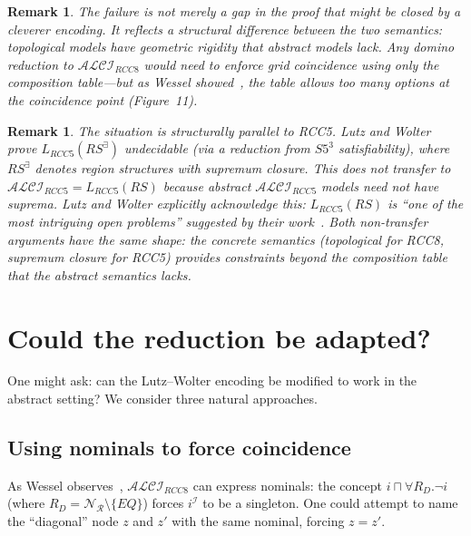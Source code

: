 \documentclass[11pt]{article}
\newtheorem{remark}[theorem]{Remark}
\newcommand{\ALCIRCC}[1]{\ensuremath{\mathcal{ALCI}_{\mathit{RCC#1}}}}
\newcommand{\LRCC}[1]{\ensuremath{L_{\mathit{RCC#1}}}}
\newcommand{\NR}{\ensuremath{\mathcal{N}_\mathcal{R}}}
\newcommand{\RS}{\mathit{RS}}
\newcommand{\RSE}{\mathit{RS}^{\exists}}
\begin{document}
\begin{remark}
  The failure is not merely a gap in the proof that might be closed by a
  cleverer encoding.  It reflects a \emph{structural} difference between the
  two semantics: topological models have geometric rigidity that abstract
  models lack.  Any domino reduction to $\ALCIRCC{8}$ would need to enforce
  grid coincidence using only the composition table---but as Wessel
  showed~\cite{Wessel2003}, the table allows too many options at the
  coincidence point (Figure~11).
\end{remark}

\begin{remark}\label{rem:rcc5-parallel}
  The situation is structurally parallel to RCC5.  Lutz and
  Wolter~\cite{LutzWolter2006} prove $\LRCC{5}(\RSE)$ undecidable (via a
  reduction from $S5^3$ satisfiability), where $\RSE$ denotes region
  structures with supremum closure.  This does not transfer to
  $\ALCIRCC{5} = \LRCC{5}(\RS)$ because abstract $\ALCIRCC{5}$ models need
  not have suprema.  Lutz and Wolter explicitly acknowledge this:
  $\LRCC{5}(\RS)$ is ``one of the most intriguing open problems'' suggested
  by their work~\cite{LutzWolter2006}.  Both non-transfer arguments have
  the same shape: the concrete semantics (topological for RCC8, supremum
  closure for RCC5) provides constraints beyond the composition table that
  the abstract semantics lacks.
\end{remark}

\section{Could the reduction be adapted?}
\label{sec:adapt}

One might ask: can the Lutz--Wolter encoding be modified to work in the
abstract setting?  We consider three natural approaches.

\subsection{Using nominals to force coincidence}

As Wessel observes~\cite{Wessel2003}, $\ALCIRCC{8}$ can express nominals:
the concept $\boxed{i} \sqcap \forall R_D.\neg\boxed{i}$ (where
$R_D = \NR \setminus \{EQ\}$) forces $\boxed{i}^{\mathcal{I}}$ to be a
singleton.  One could attempt to name the ``diagonal'' node $z$ and $z'$ with
the same nominal, forcing $z = z'$.
\end{document}
